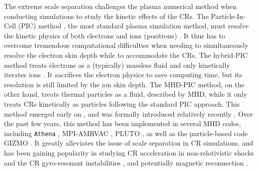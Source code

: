 \documentclass[fleqn,usenatbib]{mnras}
\begin{document}
The extreme scale separation challenges the plasma numerical method when conducting simulations to study the kinetic effects of the CRs. The Particle-In-Cell (PIC) method \citep[see][and references therein]{birdsall2018plasma}, the most standard plasma simulation method, must resolve the kinetic physics of both electrons and ions (positrons) \citep[e.g.,][]{1992ApJ...390..454H, buneman1993computer, 2005AIPC..801..345S, 2008PhPl...15e5703B}.  It thus has to overcome tremendous computational difficulties when needing to simultaneously resolve the electron skin depth while to accommodate the CRs. The hybrid-PIC method treats electrons as a (typically) massless fluid and only kinetically iterates ions \citep[e.g.,][]{2002hmst.book.....L, 2003LNP...615..136W, 2007CoPhC.176..419G, 2014JCoPh.259..154K, 2021ApJ...922L..35B, 2022PhPl...29e3902J}. It sacrifices the electron physics to save computing time, but its resolution is still limited by the ion skin depth.
The MHD-PIC method, on the other hand, treats thermal particles as a fluid, described by MHD, while it only treats CRs kinetically as particles following the standard PIC approach. This method emerged early on \citet{1986JCoPh..66..469Z, 2000MNRAS.314...65L}, and was formally introduced relatively recently \citep{2015ApJ...809...55B}. Over the past few years, this method has been implemented in several MHD codes, including \texttt{Athena} \citep{2015ApJ...809...55B}, MPI-AMRVAC \citep{2018MNRAS.473.3394V}, PLUTO \citep{2018ApJ...859...13M}, as well as the particle-based code GIZMO \citep{2022MNRAS.513..282J}. It greatly alleviates the issue of scale separation in CR simulations, and has been gaining popularity in studying CR acceleration in non-relativistic shocks \citep[e.g.,][]{2015ApJ...809...55B, 2018MNRAS.473.3394V} and the CR gyro-resonant instabilities \citep{2018MNRAS.476.2779L, 2019ApJ...876...60B, 2021ApJ...914....3P, 2021ApJ...920..141B, 2022ApJ...928..112B}, and potentially magnetic reconnection \citep{2019PhPl...26a2901D}.
\end{document}
